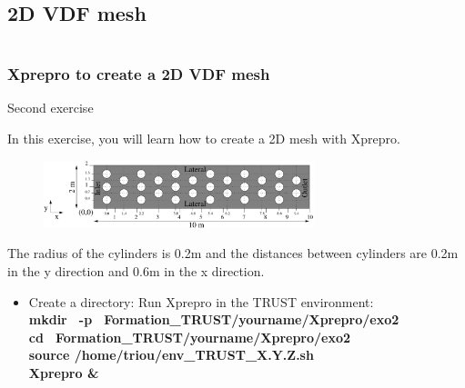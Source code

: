 \documentclass[10pt, hyperref={unicode=true,pdfusetitle, bookmarks=true,bookmarksnumbered=false,bookmarksopen=false, breaklinks=false,pdfborder={0 0 1},backref=true,colorlinks=true,linkcolor=darkblue,pageanchor}]{beamer}
\begin{document}
\subsection{2D VDF mesh}
\begin{frame}
\begin{columns}[c] 
\tableofcontents[sections={1-9},currentsection, currentsubsection]
\tableofcontents[sections={10-16},currentsection, currentsubsection]
\end{columns}
\end{frame}
\begin{frame}
\frametitle{Xprepro to create a 2D VDF mesh}
\begin{block}{Second exercise}

In this exercise, you will learn how to create a 2D mesh with Xprepro. 

\begin{figure}
\includegraphics[width=0.7\textwidth]{PICTURES/xprepro.pdf}
\end{figure}

The radius of the cylinders is 0.2m and the distances between cylinders are 0.2m in the y direction and 0.6m in the x direction. \\

\begin{itemize}
\item Create a directory: Run Xprepro in the TRUST environment:\\
\textbf{mkdir \, -p \, Formation\_TRUST/yourname/Xprepro/exo2} \\
\textbf{cd \, Formation\_TRUST/yourname/Xprepro/exo2} \\
\textbf{source /home/triou/env\_TRUST\_X.Y.Z.sh }\\
\textbf{Xprepro \&} 
\end{itemize}

\end{block}
\end{frame}
\end{document}
